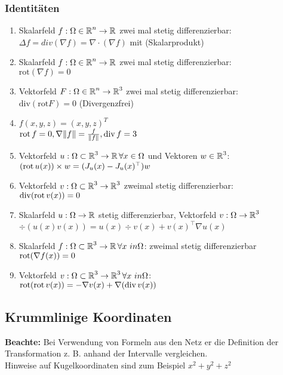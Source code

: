 \documentclass[german]{latex4ei/latex4ei_sheet}
\begin{document}
\subsubsection{Identit\"aten}
\begin{enumerate}
\item Skalarfeld $f: \Omega \in \operatorname{\mathbb R}^n \rightarrow \operatorname{\mathbb R}$ zwei mal stetig differenzierbar:\\
$\Delta f = div(\nabla f)= \nabla \cdot (\nabla f)$ mit (Skalarprodukt)
\item Skalarfeld $f: \Omega \in \operatorname{\mathbb R}^n \rightarrow \operatorname{\mathbb R}$ zwei mal stetig differenzierbar:\\
$\mathrm{rot}(\nabla f)=0$
\item Vektorfeld $F: \Omega \in \operatorname{\mathbb R}^n \rightarrow \operatorname{\mathbb R}^3$ zwei mal stetig differenzierbar:\\
$\mathrm{div}(\mathrm{rot} F)=0$ (Divergenzfrei)
\item $f (x, y, z) = (x, y, z)^T$\\
$\operatorname{rot} f=0, \nabla \|f\|=\frac{f}{\|f\|}, \operatorname{div} f=3$
\item Vektorfeld $u: \Omega \subset \operatorname{\mathbb R}^3 \to \operatorname{\mathbb R} \forall x \in \Omega$ und Vektoren $w \in \operatorname{\mathbb R}^3$:\\
$(\operatorname{rot} u(x)) \times w = (J_u(x)-J_u(x)^\top)w$
\item Vektorfeld $v: \Omega \subset \operatorname{\mathbb R}^3 \to \operatorname{\mathbb R}^3$ zweimal stetig differenzierbar:\\
$\operatorname{div}(\operatorname{rot} v(x))=0$
\item Skalarfeld $u: \Omega \to \operatorname{\mathbb R}$ stetig differenzierbar, Vektorfeld $v: \Omega \to \operatorname{\mathbb R}^3$\\
$\div(u(x)v(x))=u(x)\div v(x)+v(x)^\top \nabla u(x)$\\
\item Skalarfeld $f: \Omega \subset \operatorname{\mathbb R}^3 \to \operatorname{\mathbb R} \forall x\ in \Omega$: zweimal stetig differenzierbar\\
$\operatorname{rot}(\nabla f(x))=0$
\item Vektorfeld $v: \Omega \subset \operatorname{\mathbb R}^3 \to \operatorname{\mathbb R}^3 \forall x\ in \Omega$:\\
$\operatorname{rot}(\operatorname{rot} v(x))=-\nabla v(x) + \nabla(\operatorname{div} v(x))$
\end{enumerate}

\subsection{Krummlinige Koordinaten}
\textbf{Beachte:} Bei Verwendung von Formeln aus den Netz er die Definition der Transformation z. B. anhand der Intervalle vergleichen.\\
Hinweise auf Kugelkoordinaten sind zum Beispiel $x^2+y^2+z^2$
\end{document}
